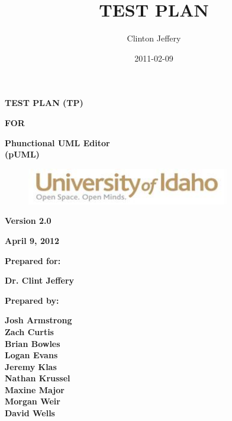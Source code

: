 \documentclass[twoside,letterpaper]{article}
\title{TEST PLAN}
\author{Clinton Jeffery}
\date{2011-02-09}
\begin{document}
\clearpage\setcounter{page}{1}\pagestyle{Standard}
\thispagestyle{FirstPage}

{\centering\bfseries
TEST PLAN (TP)
\par}

{\centering\bfseries
FOR
\par}


\bigskip

{\centering\bfseries
Phunctional UML Editor
\\(pUML)
\par}


\bigskip


\bigskip


\bigskip

{\centering \par}

\begin{figure}
\centering
\includegraphics[width=3.5in]{uidahologo.jpg}
\end{figure}

\bigskip


\bigskip


\bigskip


\bigskip


{\centering\bfseries
Version 2.0
\par}

{\centering\bfseries
April 9, 2012
\par}


\bigskip


\bigskip

{\centering\bfseries
Prepared for:
\par}

{\centering\bfseries
Dr. Clint Jeffery
\par}


\bigskip



{\centering\bfseries
Prepared by:
\par}

{\centering\bfseries
Josh Armstrong
\\Zach Curtis
\\Brian Bowles
\\Logan Evans
\\Jeremy Klas
\\Nathan Krussel
\\Maxine Major
\\Morgan Weir
\\David Wells
\par}
\end{document}
